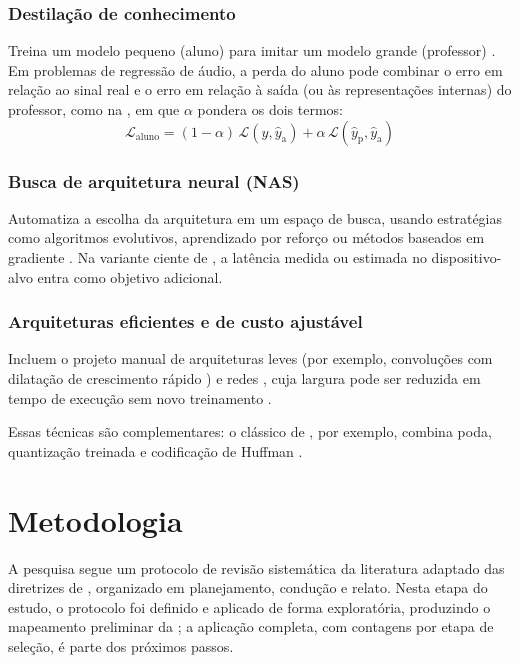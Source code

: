\documentclass[%
  a4paper,%
  12pt,%
  fleqn,%
  english,%
  brazilian,%
]{article}
\begin{document}
\subsubsection{Destilação de conhecimento}
Treina um modelo pequeno (aluno) para imitar um modelo grande (professor) \cite{Hinton2015}.
Em problemas de regressão de áudio, a perda do aluno pode combinar o erro em relação ao sinal real e o erro em relação à saída (ou às representações internas) do professor, como na , em que $\alpha$ pondera os dois termos:
\begin{equation}%
\label{eq:kd}
\mathcal{L}_{\mathrm{aluno}} = (1 - \alpha)\, \mathcal{L}\left(y, \hat{y}_{\mathrm{a}}\right) + \alpha\, \mathcal{L}\left(\hat{y}_{\mathrm{p}}, \hat{y}_{\mathrm{a}}\right)
\end{equation}

\subsubsection{Busca de arquitetura neural (NAS)}
Automatiza a escolha da arquitetura em um espaço de busca, usando estratégias como algoritmos evolutivos, aprendizado por reforço ou métodos baseados em gradiente \cite{Elsken2019}.
Na variante ciente de , a latência medida ou estimada no dispositivo-alvo entra como objetivo adicional.

\subsubsection{Arquiteturas eficientes e de custo ajustável}
Incluem o projeto manual de arquiteturas leves (por exemplo, convoluções com dilatação de crescimento rápido \cite{Steinmetz2022}) e redes , cuja largura pode ser reduzida em tempo de execução sem novo treinamento \cite{Atkinson2025}.

Essas técnicas são complementares: o  clássico de , por exemplo, combina poda, quantização treinada e codificação de Huffman \cite{Han2016}.

\section{Metodologia}%
\label{sect:metodo}

A pesquisa segue um protocolo de revisão sistemática da literatura adaptado das diretrizes de \textcite{Kitchenham2007}, organizado em planejamento, condução e relato.
Nesta etapa do estudo, o protocolo foi definido e aplicado de forma exploratória, produzindo o mapeamento preliminar da ; a aplicação completa, com contagens por etapa de seleção, é parte dos próximos passos.
\end{document}
